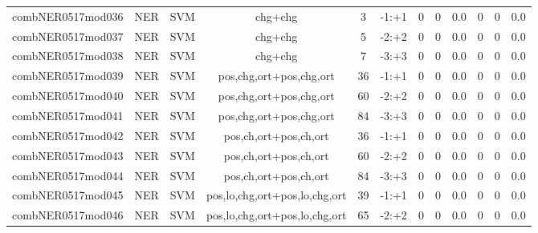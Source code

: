 \documentclass[a4paper]{article}
\begin{document}
\begin{landscape}
\begin{center}
\begin{tabular}{ |c|c|c|c|c|c|c|c|c|c|c|c|}
 
 	
 	\small{ combNER0517mod036 } & NER & SVM & chg+chg  &  3 &  -1:+1  &  0 & 0 & 0.0  &  0 & 0 & 0.0 \\
 	

 
 	
 	\small{ combNER0517mod037 } & NER & SVM & chg+chg  &  5 &  -2:+2  &  0 & 0 & 0.0  &  0 & 0 & 0.0 \\
 	

 
 	
 	\small{ combNER0517mod038 } & NER & SVM & chg+chg  &  7 &  -3:+3  &  0 & 0 & 0.0  &  0 & 0 & 0.0 \\
 	

 
 	
 	\small{ combNER0517mod039 } & NER & SVM & pos,chg,ort+pos,chg,ort  &  36 &  -1:+1  &  0 & 0 & 0.0  &  0 & 0 & 0.0 \\
 	

 
 	
 	\small{ combNER0517mod040 } & NER & SVM & pos,chg,ort+pos,chg,ort  &  60 &  -2:+2  &  0 & 0 & 0.0  &  0 & 0 & 0.0 \\
 	

 
 	
 	\small{ combNER0517mod041 } & NER & SVM & pos,chg,ort+pos,chg,ort  &  84 &  -3:+3  &  0 & 0 & 0.0  &  0 & 0 & 0.0 \\
 	

 
 	
 	\small{ combNER0517mod042 } & NER & SVM & pos,ch,ort+pos,ch,ort  &  36 &  -1:+1  &  0 & 0 & 0.0  &  0 & 0 & 0.0 \\
 	

 
 	
 	\small{ combNER0517mod043 } & NER & SVM & pos,ch,ort+pos,ch,ort  &  60 &  -2:+2  &  0 & 0 & 0.0  &  0 & 0 & 0.0 \\
 	

 
 	
 	\small{ combNER0517mod044 } & NER & SVM & pos,ch,ort+pos,ch,ort  &  84 &  -3:+3  &  0 & 0 & 0.0  &  0 & 0 & 0.0 \\
 	

 
 	
 	\small{ combNER0517mod045 } & NER & SVM & pos,lo,chg,ort+pos,lo,chg,ort  &  39 &  -1:+1  &  0 & 0 & 0.0  &  0 & 0 & 0.0 \\
 	

 
 	
 	\small{ combNER0517mod046 } & NER & SVM & pos,lo,chg,ort+pos,lo,chg,ort  &  65 &  -2:+2  &  0 & 0 & 0.0  &  0 & 0 & 0.0 \\
 	


\end{tabular}
\end{center}
\end{landscape}
\end{document}
